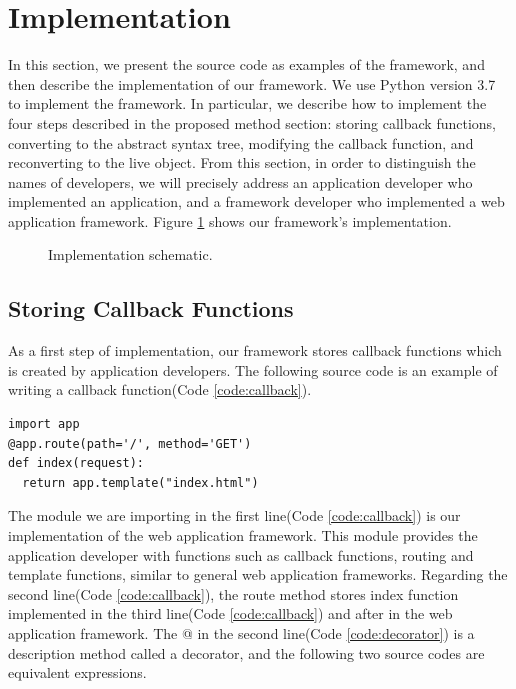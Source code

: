 \documentclass[conference]{IEEEtran}
\begin{document}
\section{Implementation}
In this section, we present the source code as examples of the framework, and then describe the implementation of our framework. We use Python version 3.7 to implement the framework.
In particular, we describe how to implement the four steps described in the proposed method section: storing callback functions, converting to the abstract syntax tree, modifying the callback function, and reconverting to the live object.
From this section, in order to distinguish the names of developers, we will precisely address an application developer who implemented an application, and a framework developer who implemented a web application framework.
Figure \ref{fig:implementation_schematic} shows our framework's implementation.
\begin{figure}[htbp]
\caption{Implementation schematic.}
\label{fig:implementation_schematic}
\end{figure}

\subsection{Storing Callback Functions}
As a first step of implementation, our framework stores callback functions which is created by application developers.
The following source code is an example of writing a callback function(Code \ref{code:callback}).

\begin{lstlisting}[caption={An example of a callback function.}, label=code:callback, captionpos=b]
import app
@app.route(path='/', method='GET')
def index(request):
  return app.template("index.html")
\end{lstlisting}
The module we are importing in the first line(Code \ref{code:callback}) is our implementation of the web application framework.
This module provides the application developer with functions such as callback functions, routing and template functions, similar to general web application frameworks.
Regarding the second line(Code \ref{code:callback}), the route method stores index function implemented in the third line(Code \ref{code:callback}) and after in the web application framework.
The @ in the second line(Code \ref{code:decorator}) is a description method called a decorator, and the following two source codes are equivalent expressions.
\end{document}
